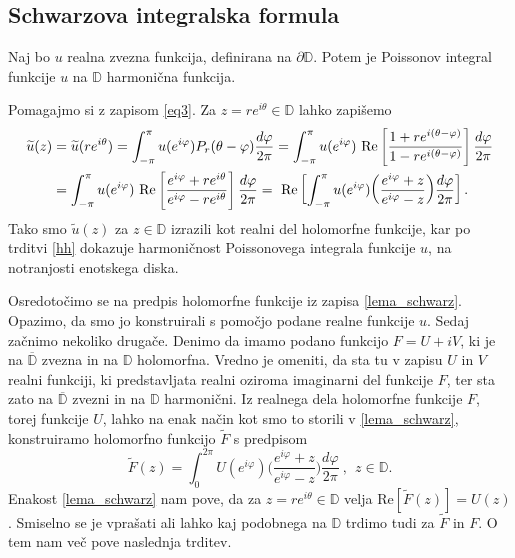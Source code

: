 \documentclass[mat1, tisk]{fmfdelo}
\begin{document}
\subsection{Schwarzova integralska formula}
     \begin{lema}
        \label{realnidel}
        Naj bo $u$ realna zvezna funkcija, definirana na $\partial \mathbb{D}$. Potem je Poissonov integral funkcije $u$ na $\mathbb{D}$ harmonična funkcija.
     \end{lema}
     \begin{dokaz}
        Pomagajmo si z zapisom \eqref{eq3}. Za $z = re^{i\theta} \in \mathbb{D}$ lahko zapišemo
            \begin{align}
                \label{lema_schwarz}
                \widetilde{u}(z) &= \widetilde{u}(r e^{i \theta}) = \int_{-\pi}^{\pi}{u(e^{i \varphi}) P_r(\theta - \varphi)\frac{d \varphi}{2 \pi}} = \int_{-\pi}^{\pi}{u(e^{i \varphi})~\text{Re}\left[\frac{1+re^{i(\theta - \varphi)}}{1-re^{i(\theta - \varphi)}}\right]\frac{d \varphi}{2 \pi}} \notag \\
                &= \int_{-\pi}^{\pi}{u(e^{i \varphi})~\text{Re}\left[\frac{e^{i\varphi}+re^{i\theta}}{e^{i\varphi}-re^{i\theta}}\right]\frac{d \varphi}{2 \pi}}=~\text{Re}\left[\int_{-\pi}^{\pi}{u(e^{i \varphi})\bigg(\frac{e^{i\varphi}+z}{e^{i\varphi}-z}\bigg)\frac{d \varphi}{2 \pi}}\right].
            \end{align}
        Tako smo $\widetilde{u}(z)$ za $z \in \mathbb{D}$ izrazili kot realni del holomorfne funkcije, kar po trditvi \ref{hh} dokazuje harmoničnost Poissonovega integrala funkcije $u$, na notranjosti enotskega diska.
     \end{dokaz}

     Osredotočimo se na predpis holomorfne funkcije iz zapisa \eqref{lema_schwarz}. Opazimo, da smo jo konstruirali s pomočjo podane realne funkcije $u$. 
     Sedaj začnimo nekoliko drugače. Denimo da imamo podano funkcijo $F = U + iV$, ki je na $\overline{\mathbb{D}}$ zvezna in na $\mathbb{D}$ holomorfna. Vredno je omeniti, da sta tu v zapisu $U$ in $V$ realni funkciji, ki predstavljata realni oziroma imaginarni del funkcije $F$, ter sta zato na $\overline{\mathbb{D}}$ zvezni in na $\mathbb{D}$ harmonični.
     Iz realnega dela holomorfne funkcije $F$, torej funkcije $U$, lahko na enak način kot smo to storili v \eqref{lema_schwarz}, konstruiramo holomorfno funkcijo $\widetilde{F}$ s predpisom
     \begin{equation}
        \label{priprav_schwarz}
        \widetilde{F}(z) = \int_{0}^{2 \pi}{U(e^{i \varphi})\bigg(\frac{e^{i\varphi}+z}{e^{i\varphi}-z}\bigg)\frac{d \varphi}{2 \pi}}~,~~z \in \mathbb{D}.
    \end{equation}
    Enakost \eqref{lema_schwarz} nam pove, da za $z = r e^{i\theta}\in \mathbb{D}$ velja $\text{Re}[\widetilde{F}(z)] = U(z)$. Smiselno se je vprašati ali lahko kaj podobnega na $\mathbb{D}$ trdimo tudi za $\widetilde{F}$ in $F$. 
    O tem nam več pove naslednja trditev. 
\end{document}
